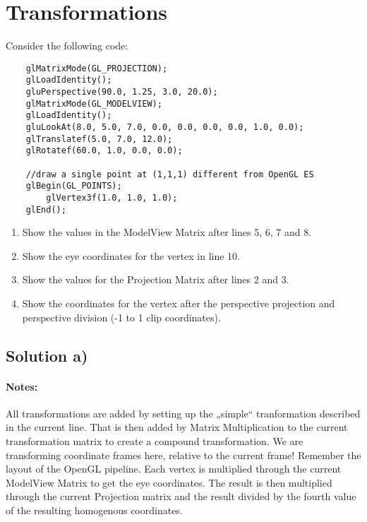 \documentclass[12pt,fleqn,reqno]{article}
\begin{document}
\section{Transformations}
Consider the following code:
\begin{lstlisting}
	glMatrixMode(GL_PROJECTION);
  	glLoadIdentity();
  	gluPerspective(90.0, 1.25, 3.0, 20.0);
  	glMatrixMode(GL_MODELVIEW);
  	glLoadIdentity();
  	gluLookAt(8.0, 5.0, 7.0, 0.0, 0.0, 0.0, 0.0, 1.0, 0.0);
  	glTranslatef(5.0, 7.0, 12.0);
  	glRotatef(60.0, 1.0, 0.0, 0.0);
  	
	//draw a single point at (1,1,1) different from OpenGL ES
 	glBegin(GL_POINTS);
    	glVertex3f(1.0, 1.0, 1.0);
 	glEnd();
\end{lstlisting}

\renewcommand{\labelenumi}{\alph{enumi})}
\begin{enumerate}
	\item{ Show the values in the ModelView Matrix after lines 5, 6, 7 and 8.}
	\item{ Show the eye coordinates for the vertex in line 10.}
	\item{ Show the values for the Projection Matrix after lines 2 and 3.}
	\item{ Show the coordinates for the vertex after the perspective projection and perspective division (-1 to 1 clip coordinates).}
\end{enumerate}

\subsection{Solution a)}

	

\paragraph{Notes:}
All transformations are added by setting up the „simple“ tranformation described in the current line. That is then added by Matrix Multiplication to the current transformation matrix to create a compound transformation.
We are transforming coordinate frames here, relative to the current frame! Remember the layout of the OpenGL pipeline. Each vertex is multiplied through the current ModelView Matrix to get the eye coordinates. The result is then multiplied through the current Projection matrix and the result divided by the fourth value of the resulting homogenous coordinates.
\end{document}
